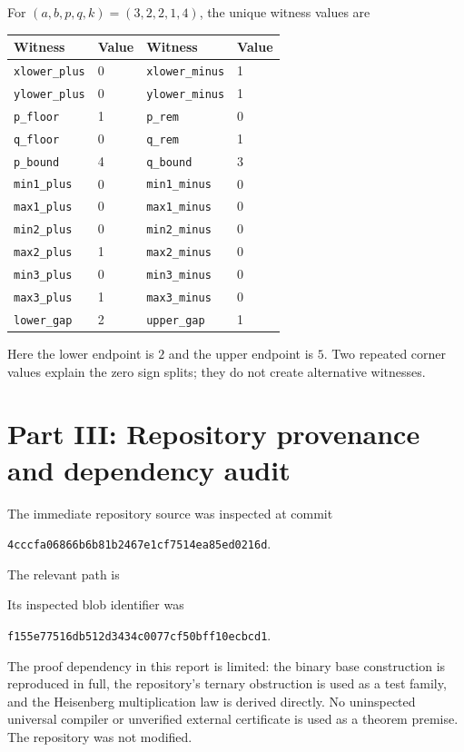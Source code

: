 \documentclass[11pt,letterpaper]{article}
\theoremstyle{definition}
\theoremstyle{remark}
\newcommand{\code}[1]{\nolinkurl{#1}}
\begin{document}
For $(a,b,p,q,k)=(3,2,2,1,4)$, the unique witness values are
\begin{center}
\small
\begin{tabular}{ll@{\qquad}ll}
\toprule
Witness &Value&Witness&Value\\
\midrule
\code{xlower_plus}&0&\code{xlower_minus}&1\\
\code{ylower_plus}&0&\code{ylower_minus}&1\\
\code{p_floor}&1&\code{p_rem}&0\\
\code{q_floor}&0&\code{q_rem}&1\\
\code{p_bound}&4&\code{q_bound}&3\\
\code{min1_plus}&0&\code{min1_minus}&0\\
\code{max1_plus}&0&\code{max1_minus}&0\\
\code{min2_plus}&0&\code{min2_minus}&0\\
\code{max2_plus}&1&\code{max2_minus}&0\\
\code{min3_plus}&0&\code{min3_minus}&0\\
\code{max3_plus}&1&\code{max3_minus}&0\\
\code{lower_gap}&2&\code{upper_gap}&1\\
\bottomrule
\end{tabular}
\end{center}
Here the lower endpoint is $2$ and the upper endpoint is $5$. Two repeated corner values explain the zero sign splits; they do not create alternative witnesses.

\section{Part III: Repository provenance and dependency audit}\label{gts:po:app:provenance}
The immediate repository source was inspected at commit
\begin{center}
\code{4cccfa06866b6b81b2467e1cf7514ea85ed0216d}.
\end{center}
The relevant path is
\begin{quote}\small
{}
\end{quote}
Its inspected blob identifier was
\begin{center}
\code{f155e77516db512d3434c0077cf50bff10ecbcd1}.
\end{center}
The proof dependency in this report is limited: the binary base construction is reproduced in full, the repository's ternary obstruction is used as a test family, and the Heisenberg multiplication law is derived directly. No uninspected universal compiler or unverified external certificate is used as a theorem premise. The repository was not modified.
\end{document}
